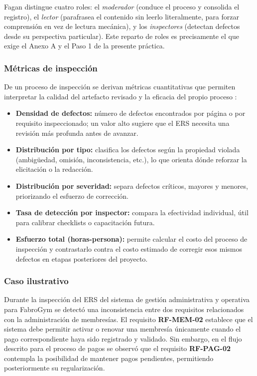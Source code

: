 \documentclass[11pt,a4paper]{article}
\begin{document}
Fagan \cite{fagan1976} distingue cuatro roles: el \emph{moderador}
(conduce el proceso y consolida el registro), el \emph{lector}
(parafrasea el contenido sin leerlo literalmente, para forzar comprensión
en vez de lectura mecánica), y los \emph{inspectores} (detectan defectos
desde su perspectiva particular). Este reparto de roles es precisamente el
que exige el Anexo A y el Paso 1 de la presente práctica.
 
\subsubsection{Métricas de inspección}
 
De un proceso de inspección se derivan métricas cuantitativas que permiten
interpretar la calidad del artefacto revisado y la eficacia del propio
proceso \cite{fagan1976, pohl2025}:
 
\begin{itemize}
  \item \textbf{Densidad de defectos:} número de defectos encontrados por
  página o por requisito inspeccionado; un valor alto sugiere que el ERS
  necesita una revisión más profunda antes de avanzar.
  \item \textbf{Distribución por tipo:} clasifica los defectos según la
  propiedad violada (ambigüedad, omisión, inconsistencia, etc.), lo que
  orienta dónde reforzar la elicitación o la redacción.
  \item \textbf{Distribución por severidad:} separa defectos críticos,
  mayores y menores, priorizando el esfuerzo de corrección.
  \item \textbf{Tasa de detección por inspector:} compara la efectividad
  individual, útil para calibrar checklists o capacitación futura.
  \item \textbf{Esfuerzo total (horas-persona):} permite calcular el
  costo del proceso de inspección y contrastarlo contra el costo estimado
  de corregir esos mismos defectos en etapas posteriores del proyecto.
\end{itemize}
 
\subsubsection{Caso ilustrativo}
 
Durante la inspección del ERS del sistema de gestión administrativa y operativa
para FabroGym se detectó una inconsistencia entre dos requisitos relacionados
con la administración de membresías. El requisito \textbf{RF-MEM-02} establece
que el sistema debe permitir activar o renovar una membresía únicamente cuando
el pago correspondiente haya sido registrado y validado. Sin embargo, en el
flujo descrito para el proceso de pagos se observó que el requisito
\textbf{RF-PAG-02} contempla la posibilidad de mantener pagos pendientes,
permitiendo posteriormente su regularización.
\end{document}
